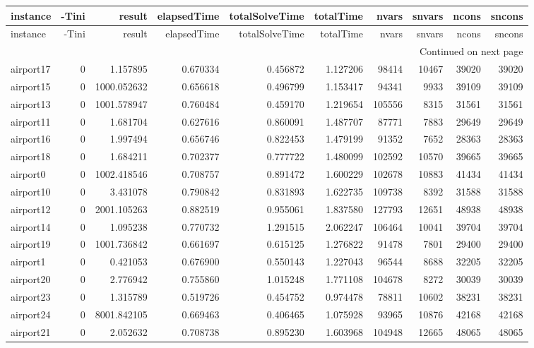 
\begin{longtable}{|l|r|r|r|r|r|r|r|r|r|}
\toprule
instance & -Tini & result & elapsedTime & totalSolveTime & totalTime & nvars & snvars & ncons & sncons \\
\midrule
\endfirsthead
\toprule
instance & -Tini & result & elapsedTime & totalSolveTime & totalTime & nvars & snvars & ncons & sncons \\
\midrule
\endhead
\midrule
\multicolumn{10}{r}{Continued on next page} \\
\midrule
\endfoot
\bottomrule
\endlastfoot
airport17 & 0 & 1.157895 & 0.670334 & 0.456872 & 1.127206 & 98414 & 10467 & 39020 & 39020 \\
airport15 & 0 & 1000.052632 & 0.656618 & 0.496799 & 1.153417 & 94341 & 9933 & 39109 & 39109 \\
airport13 & 0 & 1001.578947 & 0.760484 & 0.459170 & 1.219654 & 105556 & 8315 & 31561 & 31561 \\
airport11 & 0 & 1.681704 & 0.627616 & 0.860091 & 1.487707 & 87771 & 7883 & 29649 & 29649 \\
airport16 & 0 & 1.997494 & 0.656746 & 0.822453 & 1.479199 & 91352 & 7652 & 28363 & 28363 \\
airport18 & 0 & 1.684211 & 0.702377 & 0.777722 & 1.480099 & 102592 & 10570 & 39665 & 39665 \\
airport0 & 0 & 1002.418546 & 0.708757 & 0.891472 & 1.600229 & 102678 & 10883 & 41434 & 41434 \\
airport10 & 0 & 3.431078 & 0.790842 & 0.831893 & 1.622735 & 109738 & 8392 & 31588 & 31588 \\
airport12 & 0 & 2001.105263 & 0.882519 & 0.955061 & 1.837580 & 127793 & 12651 & 48938 & 48938 \\
airport14 & 0 & 1.095238 & 0.770732 & 1.291515 & 2.062247 & 106464 & 10041 & 39704 & 39704 \\
airport19 & 0 & 1001.736842 & 0.661697 & 0.615125 & 1.276822 & 91478 & 7801 & 29400 & 29400 \\
airport1 & 0 & 0.421053 & 0.676900 & 0.550143 & 1.227043 & 96544 & 8688 & 32205 & 32205 \\
airport20 & 0 & 2.776942 & 0.755860 & 1.015248 & 1.771108 & 104678 & 8272 & 30039 & 30039 \\
airport23 & 0 & 1.315789 & 0.519726 & 0.454752 & 0.974478 & 78811 & 10602 & 38231 & 38231 \\
airport24 & 0 & 8001.842105 & 0.669463 & 0.406465 & 1.075928 & 93965 & 10876 & 42168 & 42168 \\
airport21 & 0 & 2.052632 & 0.708738 & 0.895230 & 1.603968 & 104948 & 12665 & 48065 & 48065 \\

\end{longtable}

